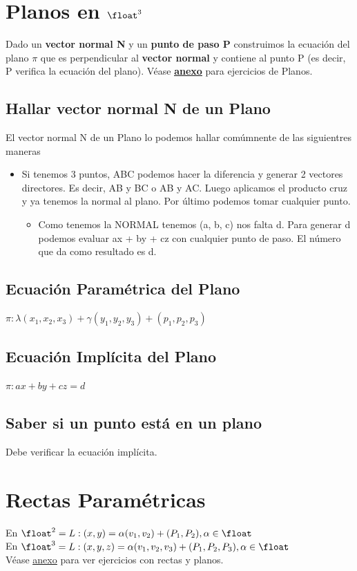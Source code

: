 \documentclass[10pt,a4paper]{article}
\begin{document}
\section*{Planos en $\float^{3}$}
Dado un \textbf{vector normal N} y un \textbf{punto de paso P} construimos la ecuación del plano $\pi$ que es perpendicular al \textbf{vector normal} y contiene al punto P (es decir, P verifica la ecuación del plano).
Véase \textbf{\hyperref[subsec:ejercicios_planos]{\underline{anexo}}} para ejercicios de Planos.
\subsection*{Hallar vector normal N de un Plano}
El vector normal N de un Plano lo podemos hallar comúmnente de las siguientres maneras 
\begin{itemize}
    \item Si tenemos 3 puntos, ABC podemos hacer la diferencia y generar 2 vectores directores. Es decir, AB y BC o AB y AC. Luego aplicamos el producto cruz y ya tenemos la normal al plano. Por último podemos tomar cualquier punto.
    \begin{itemize}
        \item Como tenemos la NORMAL tenemos (a, b, c) nos falta d. Para generar d podemos evaluar ax + by + cz con cualquier punto de paso. El número que da como resultado es d.
    \end{itemize}
\end{itemize}
\subsection*{Ecuación Paramétrica del Plano}
$ \pi: \lambda(x_{1}, x_{2}, x_{3}) + \gamma(y_{1}, y_{2}, y_{3}) + (p_{1}, p_{2}, p_{3})$
\subsection*{Ecuación Implícita del Plano}
$ \pi: ax + by + cz = d$
\subsection*{Saber si un punto está en un plano}
Debe verificar la ecuación implícita.
\section*{Rectas Paramétricas}
En $\float^{2} = L:(x,y) = \alpha (v_{1}, v_{2}) + (P_{1}, P_{2}), \alpha \in \float$ \\
En $\float^{3} = L:(x,y,z) = \alpha (v_{1}, v_{2}, v_{3}) + (P_{1}, P_{2}, P_{3}), \alpha \in \float$ \\
Véase \hyperref[subsec:ejercicios_rectas_planos]{\underline{anexo}} para ver ejercicios con rectas y planos.
\end{document}

